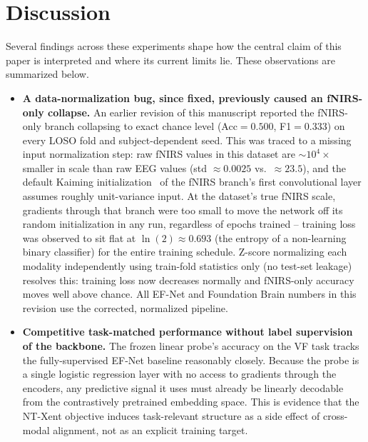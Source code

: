 \documentclass[journal]{IEEEtran}
\begin{document}
\section{Discussion}
Several findings across these experiments shape how the central claim of this paper is interpreted and where its current limits lie. These observations are summarized below.
\begin{itemize}
\item \textbf{A data-normalization bug, since fixed, previously caused an fNIRS-only collapse.} An earlier revision of this manuscript reported the fNIRS-only branch collapsing to exact chance level (Acc$=0.500$, F1$=0.333$) on every LOSO fold and subject-dependent seed. This was traced to a missing input normalization step: raw fNIRS values in this dataset are $\sim$$10^{4}\times$ smaller in scale than raw EEG values (std $\approx 0.0025$ vs.\ $\approx 23.5$), and the default Kaiming initialization~\cite{he2015} of the fNIRS branch's first convolutional layer assumes roughly unit-variance input. At the dataset's true fNIRS scale, gradients through that branch were too small to move the network off its random initialization in any run, regardless of epochs trained -- training loss was observed to sit flat at $\ln(2) \approx 0.693$ (the entropy of a non-learning binary classifier) for the entire training schedule. Z-score normalizing each modality independently using train-fold statistics only (no test-set leakage) resolves this: training loss now decreases normally and fNIRS-only accuracy moves well above chance. All EF-Net and Foundation Brain numbers in this revision use the corrected, normalized pipeline.

\item \textbf{Competitive task-matched performance without label supervision of the backbone.} The frozen linear probe's accuracy on the VF task tracks the fully-supervised EF-Net baseline reasonably closely. Because the probe is a single logistic regression layer with no access to gradients through the encoders, any predictive signal it uses must already be linearly decodable from the contrastively pretrained embedding space. This is evidence that the NT-Xent objective induces task-relevant structure as a side effect of cross-modal alignment, not as an explicit training target.


\end{itemize}
\end{document}

